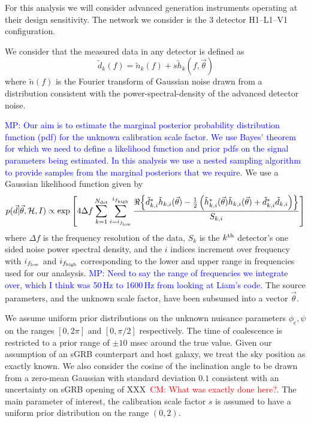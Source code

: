 \documentclass[12pt]{iopart}
\newcommand{\curlH}{\mathcal{H}}
\newcommand{\gws}{\tilde{h}}
\newcommand{\cm}[1]{\textcolor{red}{CM: #1}}
\newcommand{\MP}[1]{\textcolor{blue}{MP: #1}}
\begin{document}
For this analysis we will consider advanced generation instruments operating
at their design sensitivity.  The network we consider is the 3 detector
H1--L1--V1 configuration. 

We consider that the measured data in any detector is defined as
%
\begin{equation}
  \tilde{d}_{k}(f)=\tilde{n}_{k}(f)+s\gws_{k}(f,\vec{\theta})
\end{equation}
%
where $\tilde{n}(f)$ is the Fourier transform of Gaussian noise drawn from a
distribution consistent with the power-spectral-density of the advanced
detector noise. 

\MP{Our aim is to estimate the marginal posterior probability distribution function (pdf)
for the unknown calibration scale factor. We use Bayes' theorem for which we need to define
a likelihood function and prior pdfs on the signal parameters being estimated. In this
analysis we use a nested sampling algorithm \cite{Skilling} to provide samples from the
marginal posteriors that we require.}
We use a Gaussian likelihood function given by
%
\begin{equation}
  p(\vec{d} | \vec{\theta}, \curlH, I) \propto \exp{\left[4\Delta f \sum_{k=1}^{N_{\rm det}}
  \sum_{i=i_{f_{\rm low}}}^{i_{f_{\rm high}}}\frac{\Re{\left\{ \tilde{d}^{*}_{k,i} \gws_{k,i}(\vec{\theta})
  - \frac{1}{2}\left(\gws^*_{k,i}(\vec{\theta})\gws_{k,i}(\vec{\theta}) + \tilde{d}^*_{k,i}\tilde{d}_{k,i}\right) \right\}}}{S_{k,i}}\right]}
\end{equation}
% 
where $\Delta f$ is the frequency resolution of the data, $S_k$ is the
$k^{\rm th}$ detector's one sided noise power spectral density, and the $i$ indices
increment over frequency with $i_{f_{\rm low}}$ and $i_{f_{\rm high}}$ corresponding to
the lower and upper range in frequencies used for our
analsysis. \MP{Need to say the
range of frequencies we integrate over, which I think was 50\,Hz to 1600\,Hz from looking
at Liam's code.} The source parameters, and the unknown scale factor, have been subsumed
into a vector $\vec{\theta}$.

We assume uniform prior distributions on the unknown nuisance parameters
$\phi_{\mathrm{c}},\psi$ on the ranges $[0, 2\pi]$ and $[0, \pi/2]$ respectively.
The time of coalescence is
restricted to a prior range of $\pm 10$ msec around the true value.  Given our
assumption of an \ac{sGRB} counterpart and host galaxy, we treat the sky
position as exactly known. We also consider the cosine of the inclination angle to be drawn
from a zero-mean Gaussian with standard deviation $0.1$ consistent with an
uncertainty on \ac{sGRB} opening of XXX~\cm{What was exactly done here?}.  The
main parameter of interest, the calibration scale factor $s$ is assumed to have
a uniform prior distribution on the range $(0,2)$.    
\end{document}
